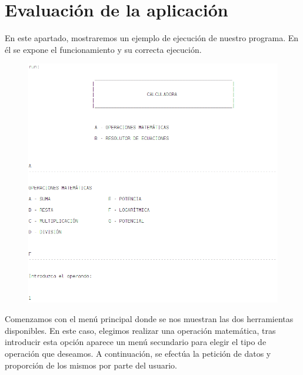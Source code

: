 \documentclass[a4paper, 11pt]{article}
\theoremstyle{plain}
\begin{document}
\section{Evaluación de la aplicación}

En este apartado, mostraremos un ejemplo de ejecución de nuestro programa. En él se expone el funcionamiento y su correcta ejecución.

\begin{figure}[!h]
		\centering
		\includegraphics[scale=0.5]{./Img/Captura1}
\end{figure}

Comenzamos con el menú principal donde se nos muestran las dos herramientas disponibles. En este caso, elegimos realizar una operación matemática, tras introducir esta opción aparece un menú secundario para elegir el tipo de operación que deseamos. A continuación, se efectúa la petición de datos y proporción de los mismos por parte del usuario. 
\end{document}
